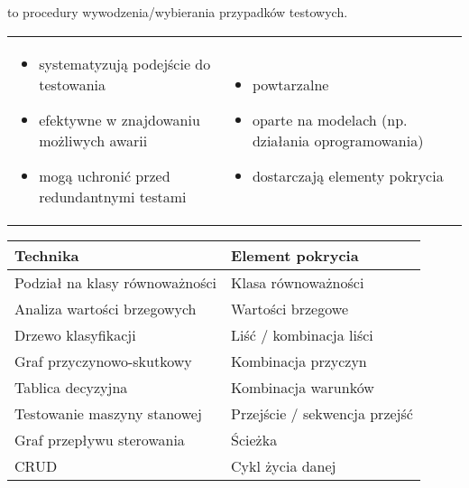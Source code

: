 \documentclass[../main.tex]{subfiles}
\begin{document}
    to procedury wywodzenia/wybierania przypadków testowych.

    \begin{table}[H]
        \begin{center}
            \begin{tabular}{p{8cm} p{8cm}}
                \begin{itemize}
                    \item systematyzują podejście do testowania
                    \item efektywne w znajdowaniu możliwych awarii
                    \item mogą uchronić przed redundantnymi testami
                \end{itemize}
                &
                \begin{itemize}
                    \item powtarzalne
                    \item oparte na modelach (np. działania oprogramowania)
                    \item dostarczają elementy pokrycia
                \end{itemize}
            \end{tabular}
        \end{center}
    \end{table}


    \begin{tabular}{|p{8cm}|p{8cm}|}
        \hline
        \textbf{Technika} & \textbf{Element pokrycia}\\
        \hline
        \hline
        Podział na klasy równoważności & Klasa równoważności\\
        \hline
        Analiza wartości brzegowych & Wartości brzegowe\\
        \hline
        Drzewo klasyfikacji & Liść / kombinacja liści\\
        \hline
        Graf przyczynowo-skutkowy & Kombinacja przyczyn\\
        \hline
        Tablica decyzyjna & Kombinacja warunków\\
        \hline
        Testowanie maszyny stanowej & Przejście / sekwencja przejść\\
        \hline
        Graf przepływu sterowania & Ścieżka\\
        \hline
        CRUD & Cykl życia danej\\
        \hline
    \end{tabular}
\end{document}
